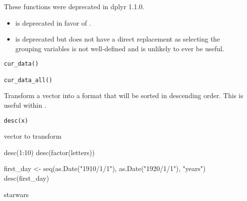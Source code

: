 \documentclass[a4paper]{book}
\begin{document}
%
\begin{Description}
\strong{[Deprecated]}

These functions were deprecated in dplyr 1.1.0.
\begin{itemize}

\item{}  is deprecated in favor of .
\item{}  is deprecated but does not have a direct replacement as
selecting the grouping variables is not well-defined and is unlikely to
ever be useful.

\end{itemize}

\end{Description}
%
\begin{Usage}
\begin{verbatim}
cur_data()

cur_data_all()
\end{verbatim}
\end{Usage}
%
\begin{Description}
Transform a vector into a format that will be sorted in descending order.
This is useful within .
\end{Description}
%
\begin{Usage}
\begin{verbatim}
desc(x)
\end{verbatim}
\end{Usage}
%
\begin{Arguments}
\begin{ldescription}
\item[\code{x}] vector to transform
\end{ldescription}
\end{Arguments}
%
\begin{Examples}
\begin{ExampleCode}
desc(1:10)
desc(factor(letters))

first_day <- seq(as.Date("1910/1/1"), as.Date("1920/1/1"), "years")
desc(first_day)

starwars %
\end{ExampleCode}
\end{Examples}
\end{document}
